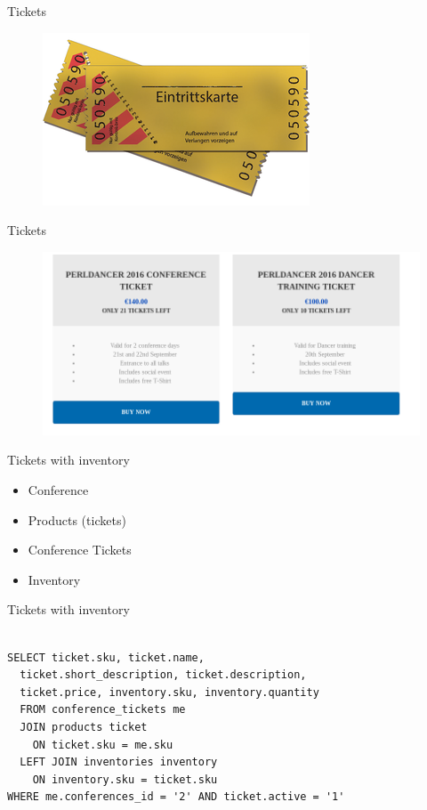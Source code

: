\begin{frame}{Tickets}
\begin{figure}[!ht]
\centering
\includegraphics[width=0.8\linewidth]{img/cinema-ticket.png}
\end{figure}
\end{frame}

\begin{frame}{Tickets}
\begin{figure}[!ht]
\centering
\includegraphics[width=0.8\linewidth]{img/ticket-view.png}
\end{figure}
\end{frame}

\begin{frame}[fragile]{Tickets with inventory}
\begin{itemize}
\item Conference
\item Products (tickets)
\item Conference Tickets
\item Inventory
\end{itemize}
\end{frame}

\begin{frame}[fragile]{Tickets with inventory}
\begin{lstlisting}

SELECT ticket.sku, ticket.name, 
  ticket.short_description, ticket.description, 
  ticket.price, inventory.sku, inventory.quantity 
  FROM conference_tickets me 
  JOIN products ticket 
    ON ticket.sku = me.sku 
  LEFT JOIN inventories inventory 
    ON inventory.sku = ticket.sku 
WHERE me.conferences_id = '2' AND ticket.active = '1'

\end{lstlisting}
\end{frame}

